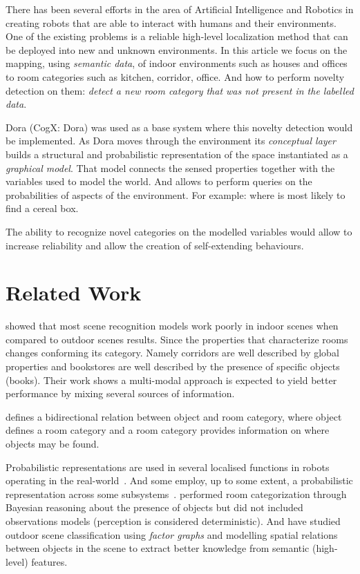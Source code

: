\documentclass[runningheads,a4paper]{llncs}
\begin{document}
There has been several efforts in the area of Artificial Intelligence and Robotics in creating robots
that are able to interact with humans and their environments.
One of the existing problems is a reliable high-level localization method that can be deployed into new
and unknown environments.
In this article we focus on the mapping, using \emph{semantic data}, of indoor environments such as houses and offices to room categories
such as kitchen, corridor, office.
And how to perform novelty detection on them: \emph{detect a new room category that was not present in the labelled data}.

Dora\cite{dora} (CogX: Dora) was used as a base system where this novelty detection would be implemented.
As Dora moves through the environment its \emph{conceptual layer} builds a structural and probabilistic representation of the space
instantiated as a \emph{graphical model}.
That model connects the sensed properties together with the variables used to model the world.
And allows to perform queries on the probabilities of aspects of the environment.
For example: where is most likely to find a cereal box\cite{exploiting}.

The ability to recognize novel categories on the modelled variables would allow to increase
reliability and allow the creation of self-extending behaviours.


\section{Related Work}
\cite{quattoni2009recognizing} showed that most scene recognition models work poorly in indoor
scenes when compared to outdoor scenes results.
Since the properties that characterize rooms changes conforming its category. Namely corridors are
well described by global properties and bookstores are well described by the presence of specific objects (books).
Their work shows a multi-modal approach is expected to yield better performance by mixing several sources of information.

\cite{galindo2005multi} defines a bidirectional relation between object and room category, where object defines a room category and a room category provides information on where objects may be found.

Probabilistic representations are used in several localised functions in robots operating in the real-world~\cite{gross2009toomas,maierprobabilistic}. And some employ, up to some extent, a probabilistic representation across some subsystems~\cite{kraft2008exploration}.
\cite{vasudevan2008bayesian} performed room categorization through Bayesian reasoning about the presence of objects but did not included observations models (perception is considered deterministic).
And \cite{boutell2006factor} have studied outdoor scene classification using \emph{factor graphs} and modelling spatial relations between objects in the scene to extract better knowledge from semantic (high-level) features.
\end{document}
